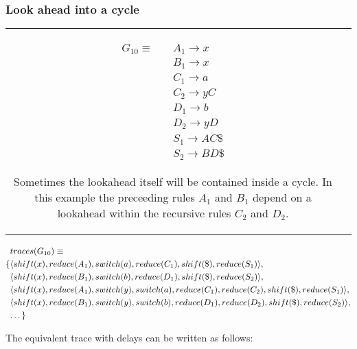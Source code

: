 \documentclass[a4paper,11pt]{article}
\begin{document}


\subsubsection{Look ahead into a cycle}
\begin{tabular}[t]{cl}
\parbox{.3\textwidth}{
\begin{align*}
G_{10} \equiv \quad & A_1 \rightarrow x\\
                  & B_1 \rightarrow x\\
                  & C_1 \rightarrow a\\
                  & C_2 \rightarrow y C\\
                  & D_1 \rightarrow b\\
                  & D_2 \rightarrow y D\\
                  & S_1 \rightarrow A C \$\\
                  & S_2 \rightarrow B D \$
\end{align*}}
\parbox{.6\textwidth}{Sometimes the lookahead itself will be contained inside a cycle.
In this example the preceeding rules $A_1$ and $B_1$ depend on a lookahead within the recursive rules $C_2$ and $D_2$.}
\end{tabular}

{\small\parbox{.3\textwidth}{\begin{align*}
&traces(G_{10}) \equiv \\
\{ & \langle shift(x), reduce(A_1), switch(a), reduce(C_1), shift(\$), reduce(S_1) \rangle,\\
   & \langle shift(x), reduce(B_1), switch(b), reduce(D_1), shift(\$), reduce(S_2) \rangle,\\
   & \langle shift(x), reduce(A_1), switch(y), switch(a), reduce(C_1), reduce(C_2), shift(\$), reduce(S_1) \rangle,\\
   & \langle shift(x), reduce(B_1), switch(y), switch(b), reduce(D_1), reduce(D_2), shift(\$), reduce(S_2) \rangle,\\
   & \textellipsis \}
\end{align*}}}

The equivalent trace with delays can be written as follows:
\end{document}
